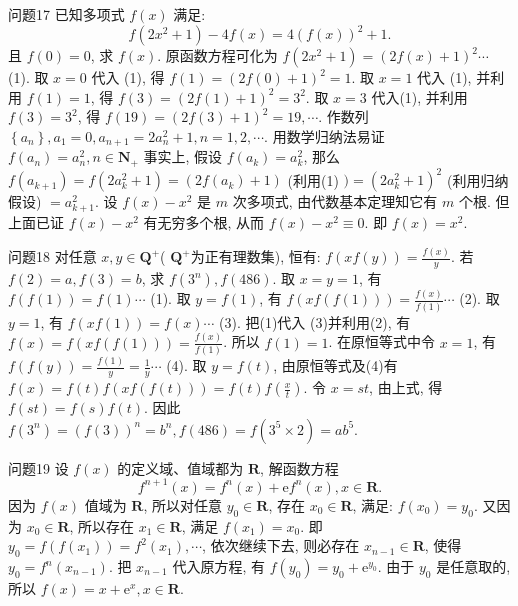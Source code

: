 问题17 已知多项式 $f(x)$ 满足:
$$
f\left(2 x^2+1\right)-4 f(x)=4(f(x))^2+1 .
$$
且 $f(0)=0$, 求 $f(x)$.
原函数方程可化为 $f\left(2 x^2+1\right)=(2 f(x)+1)^2 \cdots$ (1). 
取 $x=0$ 代入 (1), 得 $f(1)=(2 f(0)+1)^2=1$. 
取 $x=1$ 代入 (1), 并利用 $f(1)=1$, 得 $f(3)=(2 f(1)+1)^2=3^2$. 
取 $x=3$ 代入(1), 并利用 $f(3)=3^2$, 得 $f(19)= (2 f(3)+1)^2=19, \cdots$. 
作数列 $\left\{a_n\right\}, a_1=0, a_{n+1}=2 a_n^2+1, n=1,2, \cdots$. 
用数学归纳法易证 $f\left(a_n\right)=a_n^2, n \in \mathbf{N}_{+}$
事实上, 假设 $f\left(a_k\right)=a_k^2$, 那么 $f\left(a_{k+1}\right)=f\left(2 a_k^2+1\right)=\left(2 f\left(a_k\right)+1\right)$ (利用(1) $)=\left(2 a_k^2+1\right)^2$ (利用归纳假设) $=a_{k+1}^2$. 
设 $f(x)-x^2$ 是 $m$ 次多项式, 由代数基本定理知它有 $m$ 个根.
但上面已证 $f(x)-x^2$ 有无穷多个根, 从而 $f(x)-x^2 \equiv 0$. 即 $f(x)=x^2$.



问题18 对任意 $x, y \in \mathbf{Q}^{+}$( $\mathbf{Q}^{+}$为正有理数集), 恒有: $f(x f(y))=\frac{f(x)}{y}$.
若 $f(2)=a, f(3)=b$, 求 $f\left(3^n\right), f(486)$.
取 $x=y=1$, 有 $f(f(1))=f(1) \cdots$ (1). 
取 $y=f(1)$, 有 $f(x f(f(1)))=\frac{f(x)}{f(1)} \cdots$ (2). 
取 $y=1$, 有 $f(x f(1))=f(x) \cdots$ (3). 
把(1)代入 (3)并利用(2), 有 $f(x)=f(x f(f(1)))=\frac{f(x)}{f(1)}$. 所以 $f(1)=1$. 
在原恒等式中令 $x=1$, 有 $f(f(y))=\frac{f(1)}{y}=\frac{1}{y} \cdots$ (4). 
取 $y=f(t)$, 由原恒等式及(4)有 $f(x)=f(t) f(x f(f(t)))=f(t) f\left(\frac{x}{t}\right)$. 
令 $x=s t$, 由上式, 得 $f(s t)= f(s) f(t)$. 
因此 $f\left(3^n\right)=(f(3))^n=b^n, f(486)=f\left(3^5 \times 2\right)=a b^5$.



问题19 设 $f(x)$ 的定义域、值域都为 $\mathbf{R}$, 解函数方程
$$
f^{n+1}(x)=f^n(x)+\mathrm{e} f^n(x), x \in \mathbf{R} .
$$
因为 $f(x)$ 值域为 $\mathbf{R}$, 所以对任意 $y_0 \in \mathbf{R}$, 存在 $x_0 \in \mathbf{R}$, 满足: $f\left(x_0\right)=y_0$. 
又因为 $x_0 \in \mathbf{R}$, 所以存在 $x_1 \in \mathbf{R}$, 满足 $f\left(x_1\right)=x_0$. 
即 $y_0= f\left(f\left(x_1\right)\right)=f^2\left(x_1\right), \cdots$, 依次继续下去, 则必存在 $x_{n-1} \in \mathbf{R}$, 使得 $y_0= f^n\left(x_{n-1}\right)$. 
把 $x_{n-1}$ 代入原方程, 有 $f\left(y_0\right)=y_0+\mathrm{e}^{y_0}$. 
由于 $y_0$ 是任意取的, 所以 $f(x)=x+\mathrm{e}^x, x \in \mathbf{R}$.



